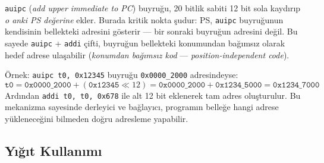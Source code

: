\begin{bilginot}
\texttt{auipc} (\emph{add upper immediate to PC}) buyruğu, 20 bitlik sabiti 12 bit sola kaydırıp \emph{o anki PS değerine} ekler. Burada kritik nokta şudur: PS, \texttt{auipc} buyruğunun kendisinin bellekteki adresini gösterir --- bir sonraki buyruğun adresini değil. Bu sayede \texttt{auipc} + \texttt{addi} çifti, buyruğun bellekteki konumundan bağımsız olarak hedef adrese ulaşabilir (\emph{konumdan bağımsız kod} --- \emph{position-independent code}).

Örnek: \texttt{auipc t0, 0x12345} buyruğu \texttt{0x0000\_2000} adresindeyse:
\[
\texttt{t0} = \texttt{0x0000\_2000} + (\texttt{0x12345} \ll 12) = \texttt{0x0000\_2000} + \texttt{0x1234\_5000} = \texttt{0x1234\_7000}
\]
Ardından \texttt{addi t0, t0, 0x678} ile alt 12 bit eklenerek tam adres oluşturulur. Bu mekanizma sayesinde derleyici ve bağlayıcı, programın belleğe hangi adrese yükleneceğini bilmeden doğru adresleme yapabilir.
\end{bilginot}

\subsection{Yığıt Kullanımı}
\label{subsec:yigit-kullanimi}


